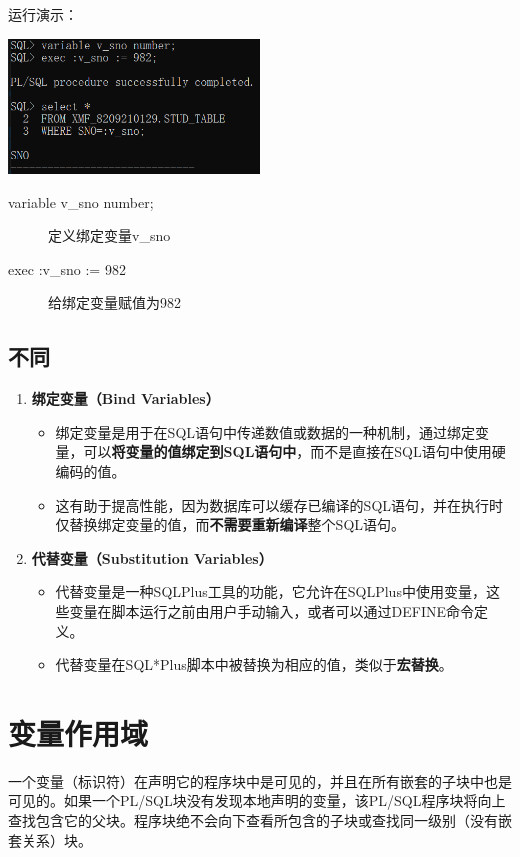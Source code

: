 \documentclass[11pt, a4paper, oneside, UTF8]{ctexbook}
\let\kaishu\relax %
\begin{document}
运行演示：
\begin{center}
  \begin{minipage}{\textwidth}
    \center
    \includegraphics[width=0.5\textwidth]{picture/绑定变量效果.png}
    \captionsetup{hypcap=false}
    \label{fig:绑定变量效果}
  \end{minipage}
\end{center}
\begin{description}
  \item[variable v\_sno number;] 定义绑定变量v\_sno
  \item[exec :v\_sno := 982] 给绑定变量赋值为982
\end{description}

\subsection{不同}

\begin{enumerate}
  \item {\bfseries\kaishu 绑定变量（Bind Variables）}
  \begin{itemize}
    \item 绑定变量是用于在SQL语句中传递数值或数据的一种机制，通过绑定变量，可以\textbf{将变量的值绑定到SQL语句中}，而不是直接在SQL语句中使用硬编码的值。
    \item 这有助于提高性能，因为数据库可以缓存已编译的SQL语句，并在执行时仅替换绑定变量的值，而\textbf{不需要重新编译}整个SQL语句。
  \end{itemize}
  \item {\bfseries\kaishu 代替变量（Substitution Variables）}
  \begin{itemize}
    \item 代替变量是一种SQLPlus工具的功能，它允许在SQLPlus中使用变量，这些变量在脚本运行之前由用户手动输入，或者可以通过DEFINE命令定义。
    \item 代替变量在SQL*Plus脚本中被替换为相应的值，类似于\textbf{宏替换}。
  \end{itemize}
\end{enumerate}
\section{变量作用域}
一个变量（标识符）在声明它的程序块中是可见的，并且在所有嵌套的子块中也是可见的。如果一个PL/SQL块没有发现本地声明的变量，该PL/SQL程序块将向上查找包含它的父块。程序块绝不会向下查看所包含的子块或查找同一级别（没有嵌套关系）块。
\end{document}
